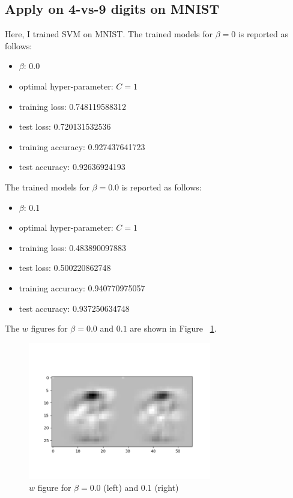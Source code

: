 \documentclass[a4paper]{article}
\begin{document}
\subsection{Apply on 4-vs-9 digits on MNIST}

Here, I trained SVM on MNIST. The trained models for $\beta=0$ is reported as follows:

\begin{itemize}
    \item $\beta$: 0.0
    \item optimal hyper-parameter: $C=1$
    \item training loss: 0.748119588312
    \item test loss: 0.720131532536
    \item training accuracy: 0.927437641723
    \item test accuracy: 0.92636924193
\end{itemize}

The trained models for $\beta=0.0$ is reported as follows:

\begin{itemize}
    \item $\beta$: 0.1
    \item optimal hyper-parameter: $C=1$
    \item training loss: 0.483890097883
    \item test loss: 0.500220862748
    \item training accuracy: 0.940770975057
    \item test accuracy: 0.937250634748
\end{itemize}

The $w$ figures for $\beta=0.0$ and $0.1$ are shown in Figure ~\ref{fig: SVM}.

\begin{figure}[htbp]
\centering
\includegraphics[width = 8cm]{SVM}
\caption{$w$ figure for $\beta=0.0$ (left) and $0.1$ (right)}
\label{fig: SVM}
\end{figure}



\end{document}
